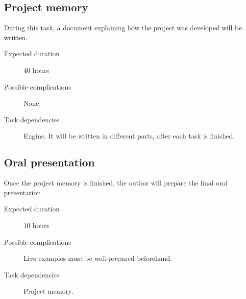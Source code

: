 \documentclass[a4paper,11pt,titlepage,abstract,numbers=noenddot,automark,mnsy,intlimits,rgb,dvipsnames]{report}
\begin{document}
\subsection{Project memory}
During this task, a document explaining how the project was developed will be written.
\begin{description}
\item[Expected duration]
40 hours
\item[Possible complications]
None.
\item[Task dependencies]
Engine. It will be written in different parts, after each task is finished.
\end{description}
\subsection{Oral presentation}
Once the project memory is finished, the author will prepare the final oral presentation.
\begin{description}
\item[Expected duration]
10 hours
\item[Possible complications]
Live examples must be well-prepared beforehand.
\item[Task dependencies]
Project memory.
\end{description}
\clearpage
\end{document}
